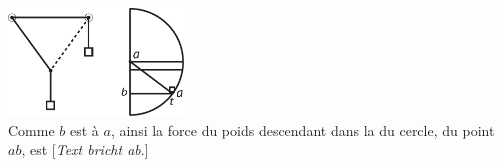 \vspace{2em}
\pstart\noindent
\centering
\includegraphics[trim = 0mm -5mm 0mm 0mm, clip, width=0.35\textwidth]{images//lh0351009_003r_2-d5+6.pdf}\\
\noindent {}%
\pend
\vspace{2em}
\pstart
{}
\pend
\vspace{0.5em}
\pstart
\noindent
\footnotesize
{Comme $b$ est \`{a} $a$, ainsi la force du poids\protect{} descendant dans la}  \small{du cercle, du point $ab$, est [\textit{Text bricht ab}.]} 
\pend
\count{}
\count{}